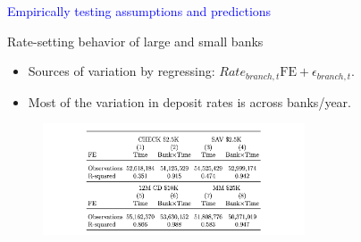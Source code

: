 \documentclass[notes,10pt, aspectratio=169]{beamer}
\begin{document}
\begin{frame}[noframenumbering]

    \huge \centering \textcolor{blue}{Empirically testing assumptions and predictions}
\end{frame}




\begin{frame}{Rate-setting behavior of large and small banks}
    \begin{itemize}
        \item Sources of variation by regressing: $Rate_{branch,t} \text{FE} + \epsilon_{branch,t}$.
        \item Most of the variation in deposit rates is across banks/year. 
    \end{itemize}

    \begin{figure}
        \centering
        \includegraphics[width=0.69\textwidth]{imgs/tab1.png}
    \end{figure}

\end{frame}
\end{document}
